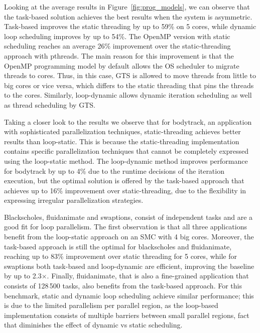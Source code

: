 Looking at the average results in Figure~\ref{fig:prog_models}, we can observe that the task-based solution 
achieves the best results when the system is asymmetric. Task-based improves the static 
threading by up to 59\% on 5 cores, while dynamic loop scheduling improves by up to 54\%.
The OpenMP version with static scheduling reaches an average 26\% improvement over the static-threading approach with pthreads. 
The main reason for this improvement is that the OpenMP programming model by default allows the OS scheduler to migrate threads to cores. 
Thus, in this case, GTS is allowed to move threads from little to big cores or vice versa, which differs to the static threading that pins the threads to the cores.
Similarly, loop-dynamic allows dynamic iteration scheduling as well as thread scheduling by GTS.

Taking a closer look to the results we observe that for bodytrack, an application with sophisticated parallelization techniques, static-threading achieves better results than loop-static.
This is because the static-threading implementation contains specific parallelization techniques that cannot be completely expressed using the loop-static method.
The loop-dynamic method improves performance for bodytrack by up to 4\% due to the runtime decisions of the iteration execution, but the optimal solution is offered by the task-based approach that achieves up to 16\% improvement over static-threading, due to the flexibility in expressing irregular parallelization strategies.
  
Blackscholes, fluidanimate and swaptions, consist of independent tasks and are a good fit for loop parallelism. 
The first observation is that all three applications benefit from the loop-static approach on an SMC with 4 big cores. 
Moreover, the task-based approach is still the optimal for blackscholes and fluidanimate, reaching up to 83\% improvement over static threading for 5 cores, while for swaptions both task-based and loop-dynamic are efficient, improving the baseline by up to 2.3$\times$.
Finally, fluidanimate, that is also a fine-grained application that consists of 128\,500 tasks, also benefits from the task-based approach. 
For this benchmark, static and dynamic loop scheduling achieve similar performance; this is due to the limited parallelism per parallel region, as the loop-based implementation consists of multiple barriers between small parallel regions, fact that diminishes the effect of dynamic vs static scheduling. 

